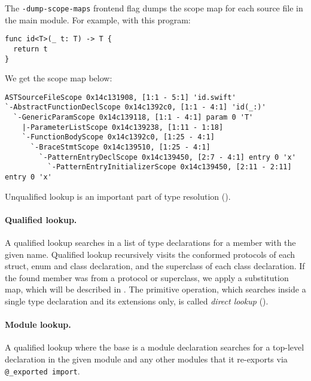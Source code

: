 \documentclass[../generics]{subfiles}
\begin{document}
The \texttt{-dump-scope-maps} frontend flag dumps the scope map for each source file in the main module. For example, with this program:
\begin{Verbatim}
func id<T>(_ t: T) -> T {
  return t
}
\end{Verbatim}
We get the scope map below:
\begin{Verbatim}[fontsize=\scriptsize,numbers=none]
ASTSourceFileScope 0x14c131908, [1:1 - 5:1] 'id.swift'
`-AbstractFunctionDeclScope 0x14c1392c0, [1:1 - 4:1] 'id(_:)'
  `-GenericParamScope 0x14c139118, [1:1 - 4:1] param 0 'T'
    |-ParameterListScope 0x14c139238, [1:11 - 1:18] 
    `-FunctionBodyScope 0x14c1392c0, [1:25 - 4:1] 
      `-BraceStmtScope 0x14c139510, [1:25 - 4:1] 
        `-PatternEntryDeclScope 0x14c139450, [2:7 - 4:1] entry 0 'x'
          `-PatternEntryInitializerScope 0x14c139450, [2:11 - 2:11] entry 0 'x'
\end{Verbatim}

Unqualified lookup is an important part of type resolution ().

\paragraph{Qualified lookup.}
A qualified lookup searches in a list of type declarations for a member with the given name. Qualified lookup recursively visits the conformed protocols of each struct, enum and class declaration, and the superclass of each class declaration. If the found member was from a protocol or superclass, we apply a substitution map, which will be described in . The primitive operation, which searches inside a single type declaration and its extensions only, is called \emph{direct lookup}  ().

\paragraph{Module lookup.} A qualified lookup where the base is a module declaration searches for a top-level declaration in the given module and any other modules that it re-exports via \texttt{@\_exported import}.
\end{document}
